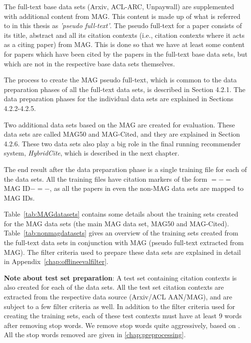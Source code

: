 The full-text base data sets (Arxiv, ACL-ARC, Unpaywall) are supplemented with additional content from MAG. This content is made up of what is referred to in this thesis as \textit{'pseudo full-text'}. The pseudo full-text for a paper consists of its title, abstract and all its citation contexts (i.e., citation contexts where it acts as a citing paper) from MAG. This is done so that we have at least some content for papers which have been cited by the papers in the full-text base data sets, but which are not in the respective base data sets themselves. 

The process to create the MAG pseudo full-text, which is common to the data preparation phases of all the full-text data sets, is described in Section 4.2.1. The data preparation phases for the individual data sets are explained in Sections 4.2.2-4.2.5.

Two additional data sets based on the MAG are created for evaluation. These data sets are called MAG50 and MAG-Cited, and they are explained in Section 4.2.6. These two data sets also play a big role in the final running recommender system, \textit{HybridCite}, which is described in the next chapter.

The end result after the data preparation phase is a single training file for each of the data sets. All the training files have citation markers of the form $=-=$MAG ID$-=-$, as all the papers in even the non-MAG data sets are mapped to MAG IDs.

Table~\ref{tab:MAGdatasets} contains some details about the training sets created for the MAG data sets (the main MAG data set, MAG50 and MAG-Cited). 
Table~\ref{tab:nonmagdatasets} gives an overview of the training sets created from the full-text data sets in conjunction with MAG (pseudo full-text extracted from MAG).
The filter criteria used to prepare these data sets are explained in detail in Appendix~\ref{chap:offlineevalfilter}.

\textbf{Note about test set preparation}:
A test set containing citation contexts is also created for each of the data sets. All the test set citation contexts are extracted from the respective data source (Arxiv/ACL AAN/MAG), and are subject to a few filter criteria as well. In addition to the filter criteria used for creating the training sets, each of these test contexts must have at least 9 words after removing stop words. We remove stop words quite aggressively, based on \cite{StoneDK11}. All the stop words removed are given in \ref{chap:preprocessing}.

